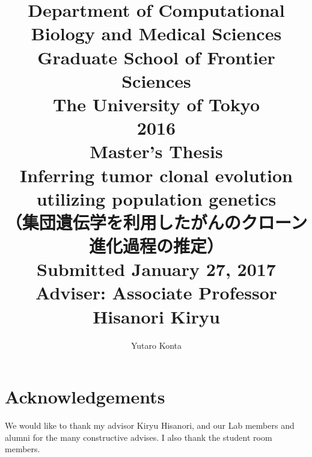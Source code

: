 \documentclass[12pt]{article}
\begin{document}
\title{{\large Department of Computational Biology and Medical Sciences\\Graduate School of Frontier Sciences\\The University of Tokyo}\vspace{4cm}\\2016\\Master's Thesis\vspace{1cm}\\Inferring tumor clonal evolution utilizing population genetics\\（集団遺伝学を利用したがんのクローン進化過程の推定）\vspace{3cm}\\{\large Submitted January 27, 2017\\Adviser: Associate Professor Hisanori Kiryu}\vspace{3cm}}
\author{{\Large Yutaro Konta}}
\date{}
\maketitle
\thispagestyle{empty}
\newpage



\newpage
\tableofcontents
\newpage







%





\section*{Acknowledgements}
We would like to thank my advisor Kiryu Hisanori, and our Lab members and alumni for the many constructive advises.
I also thank the student room members.


\end{document}
